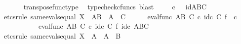\begin{isabellebody}
\ \ \ \ \isamarkupfalse%
\ transpose{\isacharunderscore}{\kern0pt}func{\isacharunderscore}{\kern0pt}type\ \isamarkupfalse%
\ {\isacharparenleft}{\kern0pt}typecheck{\isacharunderscore}{\kern0pt}cfuncs{\isacharcomma}{\kern0pt}\ blast{\isacharparenright}{\kern0pt}\isanewline
\isanewline
\ \ \isamarkupfalse%
\ {\isachardoublequoteopen}{\isasymphi}\isactrlsup {\isasymsharp}\isactrlsup {\isasymsharp}\ {\isasymcirc}\isactrlsub c\ {\isasympsi}\isactrlsup {\isasymsharp}\ {\isacharequal}{\kern0pt}\ id{\isacharparenleft}{\kern0pt}{\isacharparenleft}{\kern0pt}A\isactrlbsup B\isactrlesup {\isacharparenright}{\kern0pt}\isactrlbsup C\isactrlesup {\isacharparenright}{\kern0pt}{\isachardoublequoteclose}\isanewline
\ \ \isamarkupfalse%
{\isacharparenleft}{\kern0pt}etcs{\isacharunderscore}{\kern0pt}rule\ same{\isacharunderscore}{\kern0pt}evals{\isacharunderscore}{\kern0pt}equal{\isacharbrackleft}{\kern0pt}\ X\ {\isacharequal}{\kern0pt}\ {\isachardoublequoteopen}{\isacharparenleft}{\kern0pt}A\isactrlbsup B\isactrlesup {\isacharparenright}{\kern0pt}{\isachardoublequoteclose}{\isacharcomma}{\kern0pt}\ \ A\ {\isacharequal}{\kern0pt}\ {\isachardoublequoteopen}C{\isachardoublequoteclose}{\isacharbrackright}{\kern0pt}{\isacharparenright}{\kern0pt}\isanewline
\ \ \ \ \isamarkupfalse%
\ {\isachardoublequoteopen}eval{\isacharunderscore}{\kern0pt}func\ {\isacharparenleft}{\kern0pt}A\isactrlbsup B\isactrlesup {\isacharparenright}{\kern0pt}\ C\ {\isasymcirc}\isactrlsub c\ id\isactrlsub c\ C\ {\isasymtimes}\isactrlsub f\ {\isasymphi}\isactrlsup {\isasymsharp}\isactrlsup {\isasymsharp}\ {\isasymcirc}\isactrlsub c\ {\isasympsi}\isactrlsup {\isasymsharp}\ {\isacharequal}{\kern0pt}\isanewline
\ \ \ \ \ \ \ \ \ \ eval{\isacharunderscore}{\kern0pt}func\ {\isacharparenleft}{\kern0pt}A\isactrlbsup B\isactrlesup {\isacharparenright}{\kern0pt}\ C\ {\isasymcirc}\isactrlsub c\ id\isactrlsub c\ C\ {\isasymtimes}\isactrlsub f\ id\isactrlsub c\ {\isacharparenleft}{\kern0pt}A\isactrlbsup B\isactrlesup \isactrlbsup C\isactrlesup {\isacharparenright}{\kern0pt}{\isachardoublequoteclose}\isanewline
\ \ \ \ \isamarkupfalse%
{\isacharparenleft}{\kern0pt}etcs{\isacharunderscore}{\kern0pt}rule\ same{\isacharunderscore}{\kern0pt}evals{\isacharunderscore}{\kern0pt}equal{\isacharbrackleft}{\kern0pt}\ X\ {\isacharequal}{\kern0pt}\ {\isachardoublequoteopen}A{\isachardoublequoteclose}{\isacharcomma}{\kern0pt}\ \ A\ {\isacharequal}{\kern0pt}\ {\isachardoublequoteopen}B{\isachardoublequoteclose}{\isacharbrackright}{\kern0pt}{\isacharparenright}{\kern0pt}\isanewline

\end{isabellebody}
